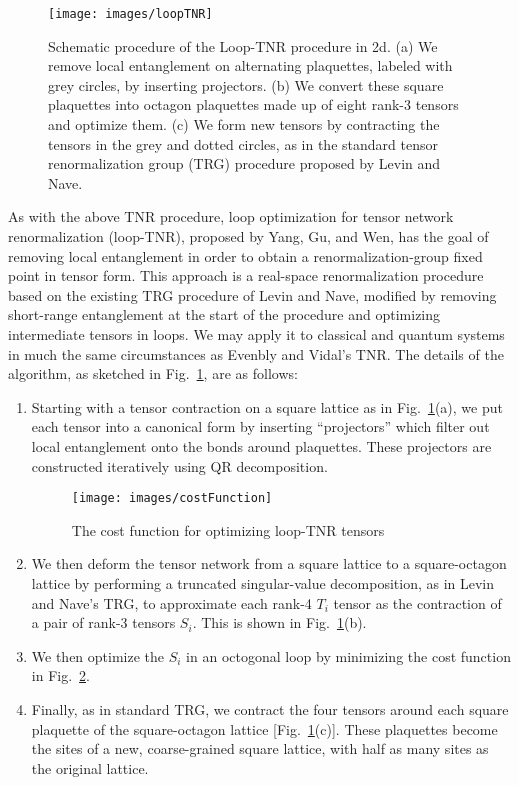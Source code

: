 \documentclass[aps,prb,letterpaper,superscriptaddress,twocolumn,showpacs,floatfix,10pt]{revtex4-1}
\begin{document}
\begin{figure}
\texttt{[image: images/loopTNR]}
\caption{ Schematic procedure of the Loop-TNR procedure in 2d. 
(a) We remove local entanglement on alternating plaquettes, labeled with grey
circles, by inserting projectors. 
(b) We convert these square plaquettes into octagon plaquettes made up of eight
rank-3 tensors and optimize them.
(c) We form new tensors by contracting the tensors in the grey and dotted
circles, as in the standard tensor renormalization group (TRG)
procedure proposed by Levin and Nave. }
  \label{fig:loopTNR}
\end{figure}

As with the above TNR procedure, loop optimization for tensor network
renormalization (loop-TNR), proposed by 
Yang, Gu, and Wen\cite{loopTNR}, has the goal of removing local entanglement in
order to obtain a renormalization-group fixed point in tensor form.
This approach is a real-space renormalization procedure based on the existing
TRG procedure \cite{Levin_TRG_2007} of Levin and Nave, modified by
removing short-range entanglement at the start of the procedure and
optimizing intermediate tensors in loops.
We may apply it to classical and quantum systems in much the same circumstances
as Evenbly and Vidal's TNR. 
The details of the algorithm, as sketched in Fig.~\ref{fig:loopTNR}, are
as follows:

\begin{enumerate}
\item Starting with a tensor contraction on a square lattice as in
Fig.~\ref{fig:loopTNR}(a), we put each
tensor into a canonical form by inserting ``projectors'' which filter out local
entanglement onto the bonds around plaquettes. These projectors are
constructed iteratively using QR decomposition.

\begin{figure}
  \texttt{[image: images/costFunction]}
  \caption{The cost function for optimizing loop-TNR tensors}
  \label{fig:costFunction}
\end{figure}

\item We then deform the tensor network from a square lattice to a
square-octagon lattice by performing a truncated singular-value decomposition,
as in Levin and Nave's TRG, to approximate each rank-4 $T_i$ tensor as the
contraction of a pair of rank-3 tensors $S_i$. This is shown in
Fig.~\ref{fig:loopTNR}(b).
\item We then optimize the $S_i$ in an octogonal loop by minimizing the cost
function in Fig.~\ref{fig:costFunction}.

\item Finally, as in standard TRG, we contract the four tensors around each
square plaquette of the square-octagon lattice [Fig.~\ref{fig:loopTNR}(c)].
These plaquettes become the
sites of a new, coarse-grained square lattice, with half as many sites as the
original lattice.
\end{enumerate}
\end{document}
